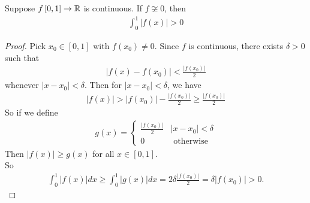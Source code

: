 \documentclass[a4paper]{article}
\begin{document}
\begin{lemma}
Suppose $f\left[0,1\right]\to\mathbb{R}$ is continuous. If $f \not\cong 0$, then
\begin{equation*}
\begin{aligned}
\int_0^1 |f\left(x\right)|>0
\end{aligned}
\end{equation*}
\begin{proof}
Pick $x_0\in\left[0,1\right]$ with $f\left(x_0\right) \neq 0.$ Since $f$ is continuous, there exists $\delta > 0$ such that
\begin{equation*}
\begin{aligned}
|f\left(x\right) - f\left(x_0\right)| < \frac{|f\left(x_0\right)|}{2}
\end{aligned}
\end{equation*}
whenever $|x-x_0| < \delta$. Then for $|x-x_0|<\delta$, we have
\begin{equation*}
\begin{aligned}
|f\left(x\right)| > |f\left(x_0\right)| - \frac{|f\left(x_0\right)|}{2} \geq \frac{|f\left(x_0\right)|}{2}
\end{aligned}
\end{equation*}
So if we define
\begin{equation*}
\begin{aligned}
g\left(x\right) = \left\{
\begin{array}{ll}
\frac{|f\left(x_0\right)|}{2} & |x-x_0| < \delta\\
0 & \text{  otherwise}
\end{array}
\right.
\end{aligned}
\end{equation*}
Then $|f\left(x\right)| \geq g\left(x\right)$ for all $x\in\left[0,1\right]$.\\
So
\begin{equation*}
\begin{aligned}
\int_0^1 |f\left(x\right)| dx \geq \int_0^1 |g\left(x\right)| dx = 2\delta \frac{|f\left(x_0\right)|}{2} = \delta |f\left(x_0\right)|>0.
\end{aligned}
\end{equation*}
\end{proof}
\end{lemma}
\end{document}
